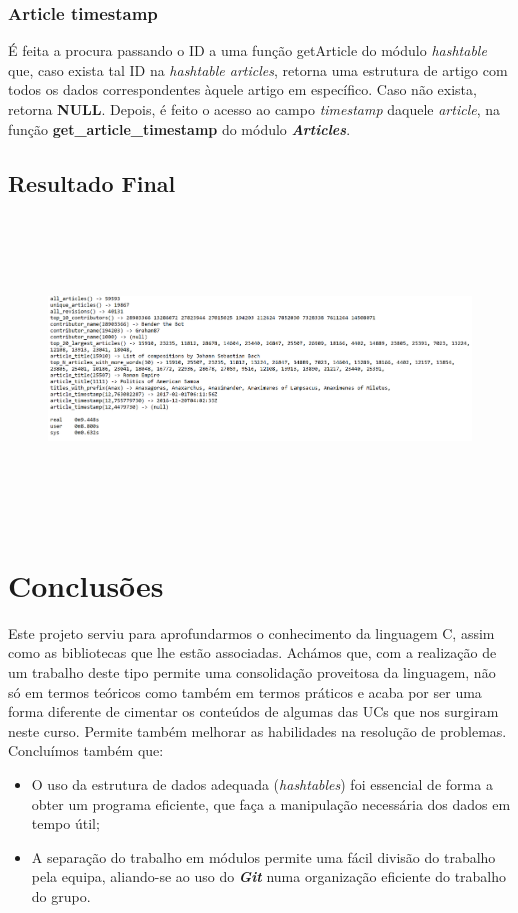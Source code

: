 \documentclass[a4paper]{article}
\begin{document}
\subsubsection{Article timestamp}
É feita a procura passando o ID a uma função getArticle do módulo \textit{hashtable} que, caso exista tal ID na \textit{hashtable articles}, retorna uma estrutura de artigo com todos os dados correspondentes àquele artigo em específico. Caso não exista, retorna \textbf{NULL}. Depois, é feito o acesso ao campo \textit{timestamp} daquele \textit{article}, na função \textbf{get\_article\_timestamp} do módulo \textbf{\textit{Articles}}.

\pagebreak
\subsection{Resultado Final}

\begin{figure}[htbp]
    \centering
    \includegraphics[width = 420pt, height = 230pt]{output}
\end{figure}

\section{Conclusões}
\label{sec:conclusao}
Este projeto serviu para aprofundarmos o conhecimento da linguagem C, assim como as bibliotecas que lhe estão associadas. Achámos que, com a realização de um trabalho deste tipo permite uma consolidação proveitosa da linguagem, não só em termos teóricos como também em termos práticos e acaba por ser uma forma diferente de cimentar os conteúdos de algumas das UCs que nos surgiram neste curso. Permite também melhorar as habilidades na resolução de problemas. Concluímos também que:

\begin{itemize}
        \item O uso da estrutura de dados adequada (\textit{hashtables}) foi essencial de forma a obter um programa eficiente, que faça a manipulação necessária dos dados em tempo útil;
 	    \item A separação do trabalho em módulos permite uma fácil divisão do trabalho pela equipa, aliando-se ao uso do \textbf{\textit{Git}} numa organização eficiente do trabalho do grupo.
\end{itemize}
\end{document}
